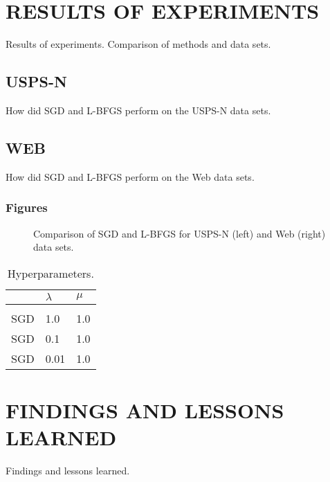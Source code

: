 \section{RESULTS OF EXPERIMENTS}
\label{sec:results}

Results of experiments. Comparison of methods and data sets.

\subsection{USPS-N}
How did SGD and L-BFGS perform on the USPS-N data sets.

\subsection{WEB}
How did SGD and L-BFGS perform on the Web data sets.


\subsubsection{Figures} 

\begin{figure}[h]
\vspace{1in}
\caption{Comparison of SGD and L-BFGS for USPS-N (left) and Web (right) data sets.}
\end{figure}

\begin{table}[t]
\caption{Hyperparameters.}
\label{tab-hyperparameters}
\begin{center}
\begin{tabular}{lll}
& $\lambda$  & $\mu$
\\ \hline \\
SGD & 1.0  & 1.0 \\
SGD & 0.1  & 1.0 \\
SGD & 0.01 & 1.0 \\
\end{tabular}
\end{center}
\end{table}



\section{FINDINGS AND LESSONS LEARNED}
\label{sec:conclusion}

Findings and lessons learned.








